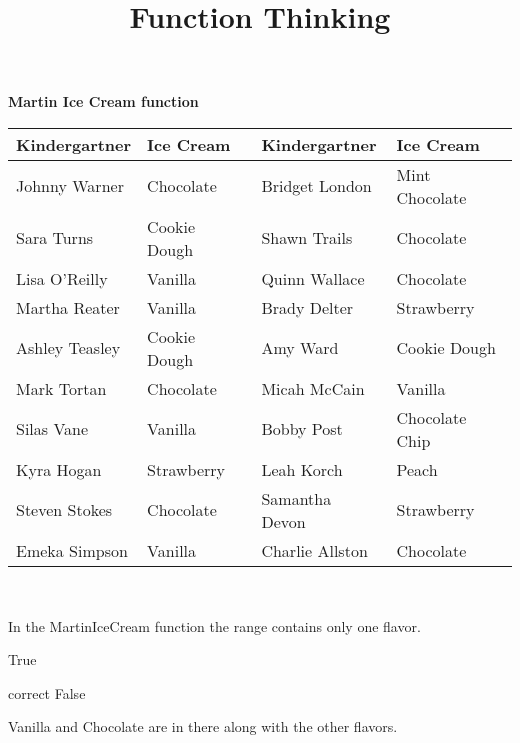 \documentclass{ximera}
\title{Function Thinking}
\begin{document}
\begin{abstract}
\end{abstract}

\maketitle


\textbf{Martin Ice Cream function} \\

\begin{center}

\begin{tabular}{|l|l|l|l|}
\hline
Kindergartner & Ice Cream & Kindergartner & Ice Cream \\\hline 
Johnny Warner & Chocolate & Bridget London & Mint Chocolate \\\hline 
Sara Turns & Cookie Dough & Shawn Trails & Chocolate \\\hline 
Lisa O'Reilly & Vanilla & Quinn Wallace & Chocolate \\\hline 
Martha Reater & Vanilla & Brady Delter & Strawberry \\\hline 
Ashley Teasley & Cookie Dough & Amy Ward & Cookie Dough \\\hline 
Mark Tortan & Chocolate & Micah McCain & Vanilla \\\hline 
Silas Vane & Vanilla & Bobby Post & Chocolate Chip \\\hline 
Kyra Hogan & Strawberry & Leah Korch & Peach \\\hline 
Steven Stokes & Chocolate & Samantha Devon & Strawberry \\\hline 
Emeka Simpson & Vanilla & Charlie Allston & Chocolate \\\hline 
\end{tabular}

\end{center}

\quad \\


\begin{question}
In the MartinIceCream function the range contains only one flavor.
\begin{multipleChoice}
\item{True}
\item[correct]{False}
\end{multipleChoice}
\begin{feedback}
Vanilla and Chocolate are in there along with the other flavors.
\end{feedback}
\end{question}
\end{document}
